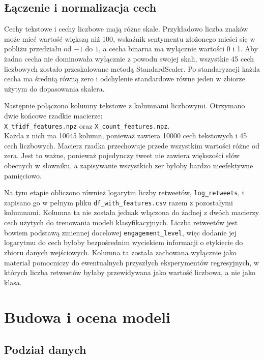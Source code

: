 \documentclass[12pt, a4paper, oneside]{scrreprt}
\begin{document}
\section{Łączenie i normalizacja cech}

Cechy tekstowe i cechy liczbowe mają różne skale. Przykładowo liczba znaków może
mieć wartość większą niż 100, wskaźnik sentymentu złożonego mieści się w pobliżu
przedziału od $-1$ do $1$, a cecha binarna ma wyłącznie wartości 0 i 1. Aby żadna
cecha nie dominowała wyłącznie z powodu swojej skali, wszystkie 45
cech liczbowych zostało przeskalowane metodą StandardScaler.
Po standaryzacji każda cecha ma średnią równą zero i odchylenie standardowe
równe jeden w zbiorze użytym do dopasowania skalera.

Następnie połączono kolumny tekstowe z kolumnami liczbowymi. Otrzymano dwie końcowe
rzadkie macierze:\\
\texttt{X\_tfidf\_features.npz} oraz \texttt{X\_count\_features.npz}.\\
Każda z nich ma \num{10045} kolumn, ponieważ zawiera \num{10000} cech tekstowych i
45 cech liczbowych. Macierz rzadka przechowuje przede wszystkim wartości
różne od zera. Jest to ważne, ponieważ pojedynczy tweet nie zawiera większości
słów obecnych w słowniku, a zapisywanie wszystkich zer byłoby bardzo nieefektywne
pamięciowo.

Na tym etapie obliczono również logarytm liczby retweetów, \texttt{log\_retweets},
i zapisano go w pełnym pliku \texttt{df\_with\_features.csv} razem z pozostałymi
kolumnami. Kolumna ta nie została jednak włączona do żadnej z dwóch macierzy cech
użytych do trenowania modeli klasyfikacyjnych. Liczba retweetów jest bowiem
podstawą zmiennej docelowej \texttt{engagement\_level}, więc dodanie jej logarytmu
do cech byłoby bezpośrednim wyciekiem informacji o etykiecie do zbioru danych
wejściowych. Kolumna ta została zachowana wyłącznie jako materiał pomocniczy
do ewentualnych przyszłych eksperymentów regresyjnych, w których liczba retweetów
byłaby przewidywana jako wartość liczbowa, a nie jako klasa.

\chapter{Budowa i ocena modeli}

\section{Podział danych}
\end{document}

